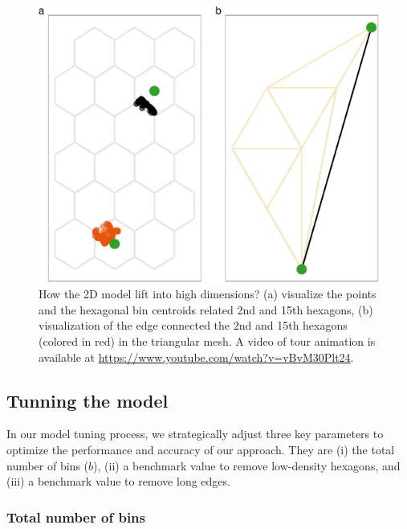 \documentclass[
  12pt]{article}
\begin{document}
\begin{figure}

{\centering \includegraphics{paper_files/figure-pdf/fig-wkhighD-1.pdf}

}

\caption{\label{fig-wkhighD}How the 2D model lift into high dimensions?
(a) visualize the points and the hexagonal bin centroids related 2nd and
15th hexagons, (b) visualization of the edge connected the 2nd and 15th
hexagons (colored in red) in the triangular mesh. A video of tour
animation is available at
\url{https://www.youtube.com/watch?v=vBvM30Plt24}.}

\end{figure}

\hypertarget{tunning-the-model}{%
\subsection{Tunning the model}\label{tunning-the-model}}

In our model tuning process, we strategically adjust three key
parameters to optimize the performance and accuracy of our approach.
They are (i) the total number of bins (\(b\)), (ii) a benchmark value to
remove low-density hexagons, and (iii) a benchmark value to remove long
edges.

\hypertarget{total-number-of-bins}{%
\subsubsection{Total number of bins}\label{total-number-of-bins}}
\end{document}
